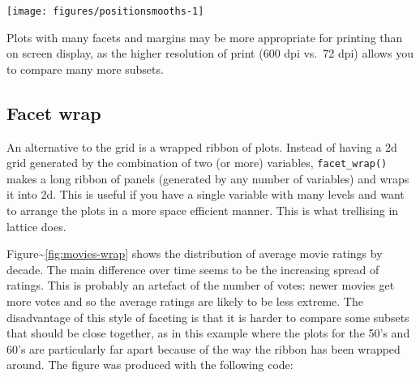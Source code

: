 \begin{Shaded}
\begin{Highlighting}[]
\NormalTok{>}\StringTok{ } \StringTok{ }
\NormalTok{+}\StringTok{   }\NormalTok{(}\NormalTok{(}  \NormalTok{, } \StringTok{ }
\NormalTok{+}\StringTok{   }\StringTok{ } 
\end{Highlighting}
\end{Shaded}

\texttt{[image: figures/positionsmooths-1]}

Plots with many facets and margins may be more appropriate for printing
than on screen display, as the higher resolution of print (600 dpi
vs.~72 dpi) allows you to compare many more subsets.

\subsection{Facet wrap}\label{sub:facet-wrap}

An alternative to the grid is a wrapped ribbon of plots. Instead of
having a 2d grid generated by the combination of two (or more)
variables, \texttt{facet\_wrap()} makes a long ribbon of panels
(generated by any number of variables) and wraps it into 2d. This is
useful if you have a single variable with many levels and want to
arrange the plots in a more space efficient manner. This is what
trellising in lattice does.  

Figure\textasciitilde{}\ref{fig:movies-wrap} shows the distribution of
average movie ratings by decade. The main difference over time seems to
be the increasing spread of ratings. This is probably an artefact of the
number of votes: newer movies get more votes and so the average ratings
are likely to be less extreme. The disadvantage of this style of
faceting is that it is harder to compare some subsets that should be
close together, as in this example where the plots for the 50's and 60's
are particularly far apart because of the way the ribbon has been
wrapped around. The figure was produced with the following code:

\begin{Shaded}
\begin{Highlighting}[]
\StringTok{ }
\StringTok{ }\NormalTok{),}
  \NormalTok{, } \NormalTok{) +}\StringTok{ }
\StringTok{  }\NormalTok{(~}\StringTok{ } \NormalTok{)}
\end{Highlighting}
\end{Shaded}

